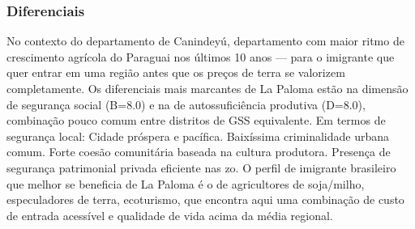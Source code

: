 \subsubsection*{Diferenciais}\label{dif-la-paloma-1412}
No contexto do departamento de Canindeyú, departamento com maior ritmo de crescimento agrícola do Paraguai nos últimos 10 anos — para o imigrante que quer entrar em uma região antes que os preços de terra se valorizem completamente. Os diferenciais mais marcantes de La Paloma estão na dimensão de segurança social (B=8.0) e na de autossuficiência produtiva (D=8.0), combinação pouco comum entre distritos de GSS equivalente. Em termos de segurança local: Cidade próspera e pacífica. Baixíssima criminalidade urbana comum. Forte coesão comunitária baseada na cultura produtora. Presença de segurança patrimonial privada eficiente nas zo. O perfil de imigrante brasileiro que melhor se beneficia de La Paloma é o de agricultores de soja/milho, especuladores de terra, ecoturismo, que encontra aqui uma combinação de custo de entrada acessível e qualidade de vida acima da média regional.
